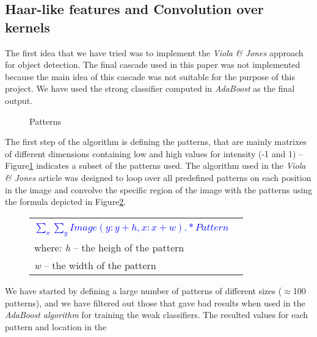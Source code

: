 \documentclass[11pt,twocolumn]{article}
\begin{document}
		\subsection{Haar-like features and Convolution over kernels}\label{sec:Haar}
			\hspace*{10px}The first idea that we have tried was to implement the
			\emph{Viola \& Jones} approach for object detection. The final cascade used in
			this paper was not implemented because the main idea of this cascade was not
			suitable for the purpose of this project. We have used the strong classifier
			computed in \emph{AdaBoost} as the final output.\\ 
			\begin{figure}[!hbtp]
				\caption{Patterns}
				\label{patterns}
			\end{figure}
			\hspace*{10px}The first step of the algorithm is defining the patterns, that
			are mainly matrixes of different dimensions containing low and high values
			for intensity (-1 and 1) -- Figure\ref{patterns} indicates a subset of the
			patterns used. The algorithm used in the \emph{Viola \& Jones} article was
			designed to loop over all predefined patterns on each position in the image
			and convolve the specific region of the image with the patterns using the
			formula depicted in Figure\ref{patterns_formula}.\\
			\begin{figure}
				\selectfont\small
				\caption{}
				\begin{tabular}{|lr|} \hline
					& \\[5pt]
					\textcolor{blue}{$\sum_x\sum_y Image(y:y+h,x:x+w) .* Pattern$} &\\[10pt]
					where: \emph{h} -- the heigh of the pattern &\\
					\hspace*{28px} \emph{w} -- the width of the pattern &\\[5pt] 
					\hline 
				\end{tabular}
				\label{patterns_formula}
			\end{figure}
			\hspace*{10px}We have started by defining a large number of patterns of
			different sizes ($\approx$100 patterns), and we have filtered out those that
			gave bad results when used in the \emph{AdaBoost algorithm} for training the
			weak classifiers. The resulted values for each pattern and location in the
\end{document}
